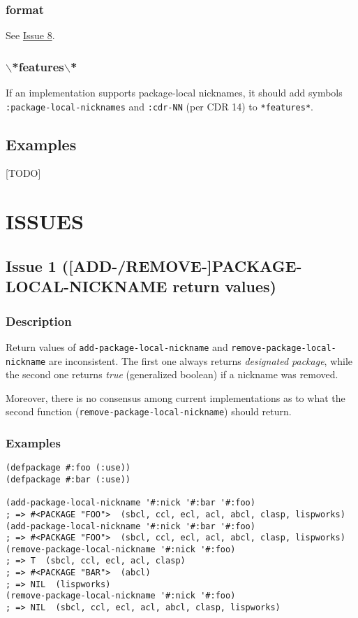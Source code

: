 \documentclass[11pt]{article}
\begin{document}
\subsubsection{format}
\label{sec:org44d3b35}
See \hyperref[sec:org1c0613b]{Issue 8}.
\subsubsection{$\backslash$*features$\backslash$*}
\label{sec:orgdf1adf9}
If an implementation supports package-local nicknames, it should add symbols
\texttt{:package-local-nicknames} and \texttt{:cdr-NN} (per CDR 14) to \texttt{*features*}.
\subsection{Examples}
\label{sec:org25fedeb}
[TODO]
\section{ISSUES}
\label{sec:orgde065cc}
\subsection{Issue 1 ([ADD-/REMOVE-]PACKAGE-LOCAL-NICKNAME return values)}
\label{sec:org70eaaf0}
\subsubsection{Description}
\label{sec:org378c1ff}
Return values of \texttt{add-package-local-nickname} and \texttt{remove-package-local-nickname}
are inconsistent. The first one always returns \emph{designated package}, while the
second one returns \emph{true} (generalized boolean) if a nickname was removed.

Moreover, there is no consensus among current implementations as to what the second
function (\texttt{remove-package-local-nickname}) should return.
\subsubsection{Examples}
\label{sec:org503dde7}
\begin{verbatim}
(defpackage #:foo (:use))
(defpackage #:bar (:use))

(add-package-local-nickname '#:nick '#:bar '#:foo)
; => #<PACKAGE "FOO">  (sbcl, ccl, ecl, acl, abcl, clasp, lispworks)
(add-package-local-nickname '#:nick '#:bar '#:foo)
; => #<PACKAGE "FOO">  (sbcl, ccl, ecl, acl, abcl, clasp, lispworks)
(remove-package-local-nickname '#:nick '#:foo)
; => T  (sbcl, ccl, ecl, acl, clasp)
; => #<PACKAGE "BAR">  (abcl)
; => NIL  (lispworks)
(remove-package-local-nickname '#:nick '#:foo)
; => NIL  (sbcl, ccl, ecl, acl, abcl, clasp, lispworks)
\end{verbatim}
\end{document}
